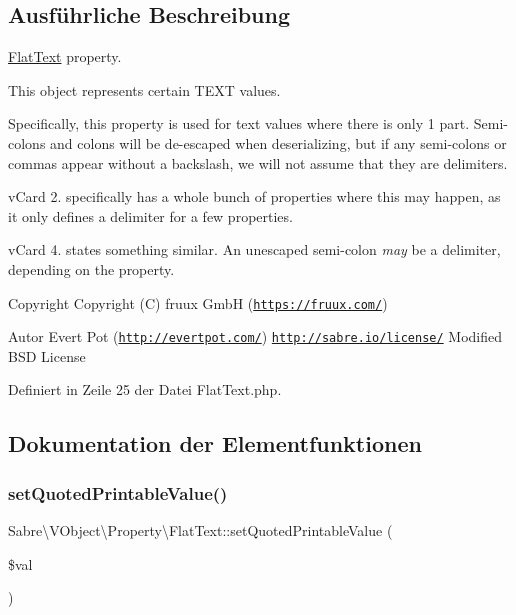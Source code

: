 \subsection{Ausführliche Beschreibung}
\mbox{\hyperlink{class_sabre_1_1_v_object_1_1_property_1_1_flat_text}{Flat\+Text}} property.

This object represents certain T\+E\+XT values.

Specifically, this property is used for text values where there is only 1 part. Semi-\/colons and colons will be de-\/escaped when deserializing, but if any semi-\/colons or commas appear without a backslash, we will not assume that they are delimiters.

v\+Card 2. specifically has a whole bunch of properties where this may happen, as it only defines a delimiter for a few properties.

v\+Card 4. states something similar. An unescaped semi-\/colon {\itshape may} be a delimiter, depending on the property.

\begin{DoxyCopyright}{Copyright}
Copyright (C) fruux GmbH (\href{https://fruux.com/}{\tt https\+://fruux.\+com/}) 
\end{DoxyCopyright}
\begin{DoxyAuthor}{Autor}
Evert Pot (\href{http://evertpot.com/}{\tt http\+://evertpot.\+com/})  \href{http://sabre.io/license/}{\tt http\+://sabre.\+io/license/} Modified B\+SD License 
\end{DoxyAuthor}


Definiert in Zeile 25 der Datei Flat\+Text.\+php.



\subsection{Dokumentation der Elementfunktionen}
\mbox{\label{class_sabre_1_1_v_object_1_1_property_1_1_flat_text_acb5942fc9d114d68013b6a15303d5967}} 
\subsubsection{\texorpdfstring{set\+Quoted\+Printable\+Value()}{setQuotedPrintableValue()}}
{\footnotesize\ttfamily Sabre\textbackslash{}\+V\+Object\textbackslash{}\+Property\textbackslash{}\+Flat\+Text\+::set\+Quoted\+Printable\+Value (\begin{DoxyParamCaption}\item[{}]{\$val }\end{DoxyParamCaption})}

